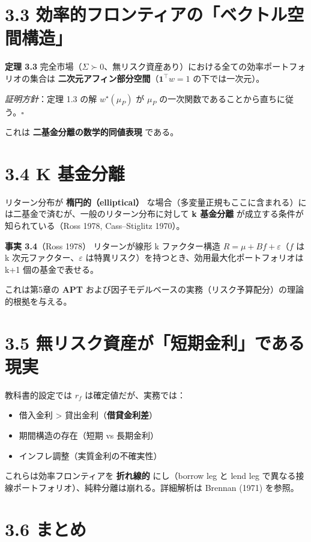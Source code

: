 \documentclass[11pt,a4paper]{report}
\begin{document}
\section{3.3 効率的フロンティアの「ベクトル空間構造」}

\textbf{定理 3.3} 完全市場（$\Sigma \succ 0$、無リスク資産あり）における全ての効率ポートフォリオの集合は \textbf{二次元アフィン部分空間}（$\mathbf{1}^\top w = 1$ の下では一次元）。

\emph{証明方針}：定理 1.3 の解 $w^\star(\mu_P)$ が $\mu_P$ の一次関数であることから直ちに従う。$\square$

これは \textbf{二基金分離の数学的同値表現} である。

\section{3.4 K 基金分離}

リターン分布が \textbf{楕円的（elliptical）} な場合（多変量正規もここに含まれる）には二基金で済むが、一般のリターン分布に対して \textbf{k 基金分離} が成立する条件が知られている（Ross 1978, Cass–Stiglitz 1970）。

\textbf{事実 3.4}（Ross 1978） リターンが線形 k ファクター構造 $R = \mu + B f + \varepsilon$（$f$ は k 次元ファクター、$\varepsilon$ は特異リスク）を持つとき、効用最大化ポートフォリオは k+1 個の基金で表せる。

これは第5章の \textbf{APT} および因子モデルベースの実務（リスク予算配分）の理論的根拠を与える。

\section{3.5 無リスク資産が「短期金利」である現実}

教科書的設定では $r_f$ は確定値だが、実務では：

\begin{itemize}
\item 借入金利 > 貸出金利（\textbf{借貸金利差}）
\item 期間構造の存在（短期 vs 長期金利）
\item インフレ調整（実質金利の不確実性）
\end{itemize}

これらは効率フロンティアを \textbf{折れ線的} にし（borrow leg と lend leg で異なる接線ポートフォリオ）、純粋分離は崩れる。詳細解析は Brennan (1971) を参照。

\section{3.6 まとめ}
\end{document}
